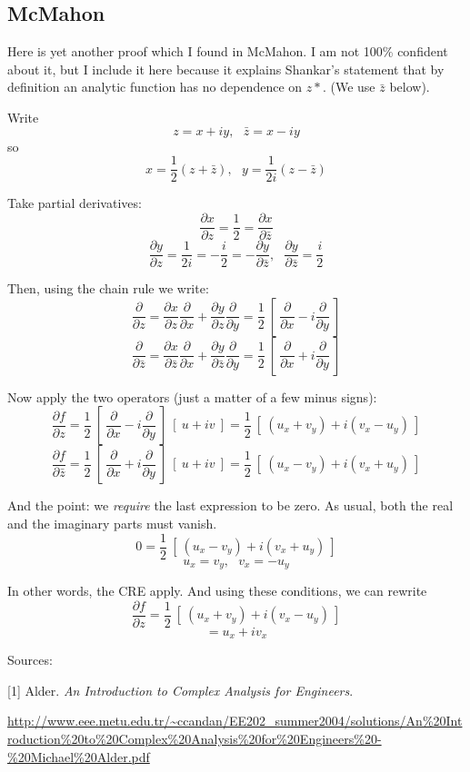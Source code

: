 \documentclass[11pt, oneside]{article}   	%
\begin{document}
\subsection*{McMahon}
Here is yet another proof which I found in McMahon.  I am not 100\% confident about it, but I include it here because it explains Shankar's statement that by definition an analytic function has no dependence on $z*$.  (We use $\bar{z}$ below).

Write
\[ z = x + iy , \ \ \  \bar{z} = x - iy \]
so
\[ x = \frac{1}{2} (z + \bar{z}) , \ \ \ y = \frac{1}{2i} (z - \bar{z}) \]

Take partial derivatives:
\[ \frac{\partial x}{\partial z} = \frac{1}{2} = \frac{\partial x}{\partial \bar{z}} \]
\[ \frac{\partial y}{\partial z} = \frac{1}{2i} = -\frac{i}{2} = -\frac{\partial y}{\partial \bar{z}} , \ \ \ \frac{\partial y}{\partial \bar{z}} = \frac{i}{2} \]

Then, using the chain rule we write:
\[ \frac{\partial}{\partial z} =  \frac{\partial x}{\partial z}  \frac{\partial}{\partial x} + \frac{\partial y}{\partial z}  \frac{\partial}{\partial y} = \frac{1}{2} \ [ \ \frac{\partial}{\partial x} - i \frac{\partial}{\partial y} \ ] \]
\[ \frac{\partial}{\partial \bar{z}} =  \frac{\partial x}{\partial \bar{z}}  \frac{\partial}{\partial x} + \frac{\partial y}{\partial \bar{z}}  \frac{\partial}{\partial y} = \frac{1}{2} \ [ \ \frac{\partial}{\partial x} + i \frac{\partial}{\partial y} \ ] \]

Now apply the two operators (just a matter of a few minus signs):
\[ \frac{\partial f}{\partial z} =  \frac{1}{2} \ [ \ \frac{\partial}{\partial x} - i \frac{\partial}{\partial y} \ ]  \ [ \ u + iv \ ] = \frac{1}{2} \ [ \ (u_x + v_y) + i( v_x - u_y) \ ] \]
\[ \frac{\partial f}{\partial \bar{z}} =  \frac{1}{2} \ [ \ \frac{\partial}{\partial x} + i \frac{\partial}{\partial y} \ ]  \ [ \ u + iv \ ] = \frac{1}{2} \ [ \ (u_x - v_y) + i( v_x + u_y) \ ] \]

And the point:  we \emph{require} the last expression to be zero.  As usual, both the real and the imaginary parts must vanish.
\[ 0 = \frac{1}{2} \ [ \ (u_x - v_y) + i( v_x + u_y) \ ] \]
\[ u_x = v_y, \ \ \ v_x = - u_y \]

In other words, the CRE apply.  And using these conditions, we can rewrite
\[ \frac{\partial f}{\partial z} = \frac{1}{2} \ [ \ (u_x + v_y) + i( v_x - u_y) \ ] \]
\[ = u_x +  iv_x \]

Sources:

[1] Alder.  \emph{An Introduction to Complex Analysis for Engineers}.

\url{http://www.eee.metu.edu.tr/~ccandan/EE202_summer2004/solutions/An%20Introduction%20to%20Complex%20Analysis%20for%20Engineers%20-%20Michael%20Alder.pdf}
\end{document}
